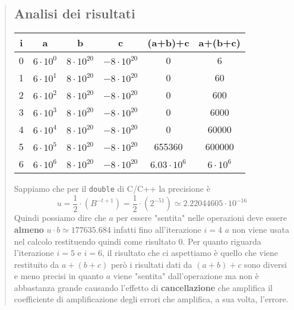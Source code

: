 \documentclass[10pt]{article}
\begin{document}
\begin{quote}
    \subsection{Analisi dei risultati}
    \begin{center}
        \begin{tabular}{| c | c | c | c | c | c |}
            \hline
            \textbf{i} & \textbf{a} & \textbf{b} & \textbf{c} & \textbf{(a+b)+c} & \textbf{a+(b+c)} \\
            \hline
            0 &$6\cdot 10^{0}$  & $8 \cdot 10^{20}$ & $-8 \cdot 10^{20}$ & 0 & 6\\
            \hline
            1 &$6\cdot 10^{1}$ & $8 \cdot 10^{20}$ & $-8 \cdot 10^{20}$ & 0 & 60\\
            \hline
            2 &$6\cdot 10^{2}$ & $8 \cdot 10^{20}$ & $-8 \cdot 10^{20}$ & 0 & 600\\
            \hline
            3 &$6\cdot 10^{3}$ & $8 \cdot 10^{20}$ & $-8 \cdot 10^{20}$ & 0 & 6000\\
            \hline
            4 &$6\cdot 10^{4}$ & $8 \cdot 10^{20}$ & $-8 \cdot 10^{20}$ & 0 & 60000\\
            \hline
            5 &$6\cdot 10^{5}$ & $8 \cdot 10^{20}$ & $-8 \cdot 10^{20}$ & 655360 & 600000\\
            \hline
            6 &$6\cdot 10^{6}$ & $8 \cdot 10^{20}$ & $-8 \cdot 10^{20}$ & $6.03\cdot 10^{6}$ & $6\cdot 10^{6}$ \\
            \hline
        \end{tabular}
    \end{center}
    Sappiamo che per il \texttt{double} di C/C++ la precisione è
    \begin{equation*}
        u=\frac{1}{2}\cdot\left(B^{-t+1}\right) = \frac{1}{2}\cdot\left(2^{-51}\right) \simeq 2.22044605\cdot 10^{-16}  
    \end{equation*}
    Quindi possiamo dire che $a$ per essere "sentita" nelle operazioni deve essere \textbf{almeno} $u\cdot b\simeq 177635.684$ infatti fino all'iterazione $i=4$ $a$ non viene usata nel calcolo restituendo quindi come risultato 0. Per quanto riguarda l'iterazione $i=5$ e $i=6$, il risultato che ci aspettiamo è quello che viene restituito da $a+(b+c)$ però i risultati dati da $(a+b)+c$ sono diversi e meno precisi in quanto $a$ viene "sentita" dall'operazione ma non è abbastanza grande causando l'effetto di \textbf{cancellazione} che amplifica il coefficiente di amplificazione degli errori che amplifica, a sua volta, l'errore. 
\end{quote}
\newpage
\end{document}
